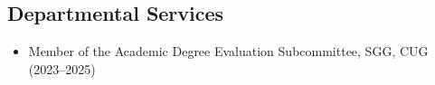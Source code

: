 \subsection{Departmental Services}
\begin{itemize}
\item Member of the Academic Degree Evaluation Subcommittee, SGG, CUG (2023--2025)
\end{itemize}
